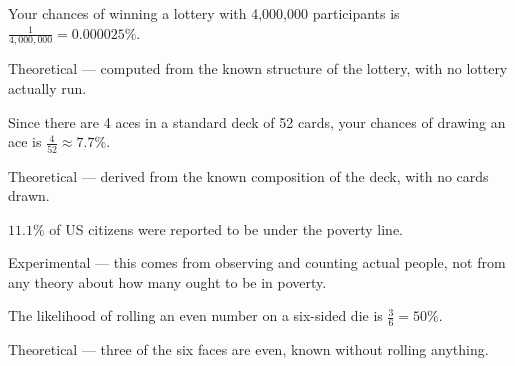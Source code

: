 \documentclass[12pt]{ximera}
\begin{document}
\begin{problem}
Your chances of winning a lottery with 4,000,000 participants is
$\frac{1}{4{,}000{,}000} = 0.000025\%$.
\begin{multipleChoice}
\end{multipleChoice}

\begin{solution}
Theoretical --- computed from the known structure of the lottery, with no lottery actually
run.
\end{solution}
\end{problem}

\begin{problem}
Since there are 4 aces in a standard deck of 52 cards, your chances of drawing an ace is
$\frac{4}{52} \approx 7.7\%$.
\begin{multipleChoice}
\end{multipleChoice}

\begin{solution}
Theoretical --- derived from the known composition of the deck, with no cards drawn.
\end{solution}
\end{problem}

\begin{problem}
$11.1\%$ of US citizens were reported to be under the poverty line.
\begin{multipleChoice}
\end{multipleChoice}

\begin{solution}
Experimental --- this comes from observing and counting actual people, not from any
theory about how many ought to be in poverty.
\end{solution}
\end{problem}

\begin{problem}
The likelihood of rolling an even number on a six-sided die is $\frac{3}{6} = 50\%$.
\begin{multipleChoice}
\end{multipleChoice}

\begin{solution}
Theoretical --- three of the six faces are even, known without rolling anything.
\end{solution}
\end{problem}
\end{document}
